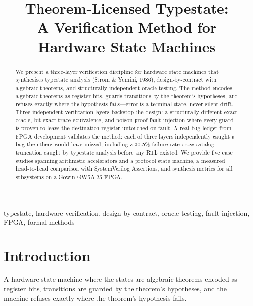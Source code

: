 \documentclass[conference]{IEEEtran}
\begin{document}
\title{Theorem-Licensed Typestate:\\A Verification Method for Hardware State Machines}

\author{
}

\maketitle

\begin{abstract}
We present a three-layer verification discipline for hardware state machines
that synthesises typestate analysis (Strom \& Yemini, 1986), design-by-contract
with algebraic theorems, and structurally independent oracle testing.  The
method encodes algebraic theorems as register bits, guards transitions by the
theorem's hypotheses, and refuses exactly where the hypothesis fails---error is
a terminal state, never silent drift.  Three independent verification layers
backstop the design: a structurally different exact oracle, bit-exact trace
equivalence, and poison-proof fault injection where every guard is proven to
leave the destination register untouched on fault.  A real bug ledger from FPGA
development validates the method: each of three layers independently caught a
bug the others would have missed, including a 50.5\%-failure-rate
cross-catalog truncation caught by typestate analysis before any RTL existed.
We provide five case studies spanning arithmetic accelerators and a protocol
state machine, a measured head-to-head comparison with SystemVerilog
Assertions, and synthesis metrics for all subsystems on a Gowin GW5A-25 FPGA.
\end{abstract}

\begin{IEEEkeywords}
typestate, hardware verification, design-by-contract, oracle testing,
fault injection, FPGA, formal methods
\end{IEEEkeywords}

\section{Introduction}

A hardware state machine where the states are algebraic theorems encoded as
register bits, transitions are guarded by the theorem's hypotheses, and the
machine refuses exactly where the theorem's hypothesis fails.
\end{document}
